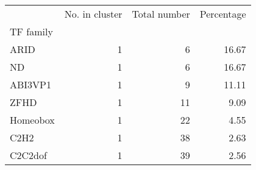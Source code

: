\begin{tabular}{lrrr}
\toprule
{} &  No. in cluster &  Total number &  Percentage \\
TF family &                 &               &             \\
\midrule
ARID      &               1 &             6 &       16.67 \\
ND        &               1 &             6 &       16.67 \\
ABI3VP1   &               1 &             9 &       11.11 \\
ZFHD      &               1 &            11 &        9.09 \\
Homeobox  &               1 &            22 &        4.55 \\
C2H2      &               1 &            38 &        2.63 \\
C2C2dof   &               1 &            39 &        2.56 \\
\bottomrule
\end{tabular}
